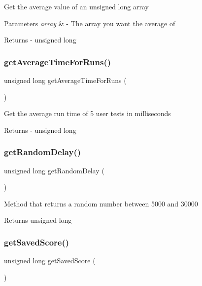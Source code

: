 Get the average value of an unsigned long array 
\begin{DoxyParams}{Parameters}
{\em array} & -\/ The array you want the average of \\
\hline
\end{DoxyParams}
\begin{DoxyReturn}{Returns}
-\/ unsigned long 
\end{DoxyReturn}
\mbox{\label{test_8ino_a3991b3fec82a370bed6f323e5496ba34}} 
\subsubsection{\texorpdfstring{getAverageTimeForRuns()}{getAverageTimeForRuns()}}
{\footnotesize\ttfamily unsigned long get\+Average\+Time\+For\+Runs (\begin{DoxyParamCaption}{ }\end{DoxyParamCaption})}

Get the average run time of 5 user tests in milliseconds \begin{DoxyReturn}{Returns}
-\/ unsigned long 
\end{DoxyReturn}
\mbox{\label{test_8ino_acfe46c2625596d6b059364eae0d9de41}} 
\subsubsection{\texorpdfstring{getRandomDelay()}{getRandomDelay()}}
{\footnotesize\ttfamily unsigned long get\+Random\+Delay (\begin{DoxyParamCaption}{ }\end{DoxyParamCaption})}

Method that returns a random number between 5000 and 30000 \begin{DoxyReturn}{Returns}
unsigned long 
\end{DoxyReturn}
\mbox{\label{test_8ino_ae10d67159ad951c6d293550eba144547}} 
\subsubsection{\texorpdfstring{getSavedScore()}{getSavedScore()}}
{\footnotesize\ttfamily unsigned long get\+Saved\+Score (\begin{DoxyParamCaption}{ }\end{DoxyParamCaption})}

